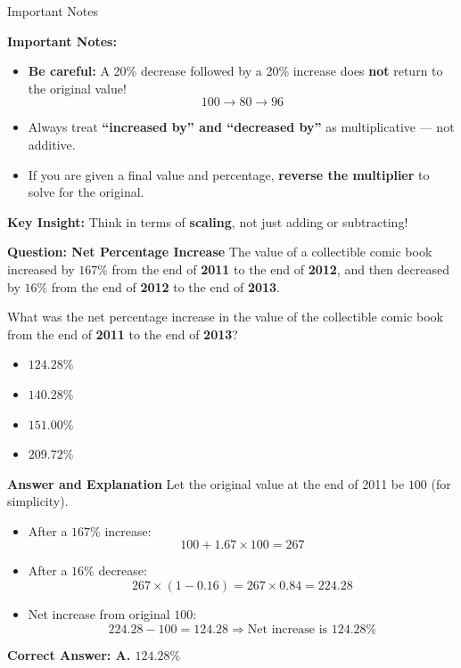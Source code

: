 \documentclass{beamer}
\begin{document}
\begin{frame}{Important Notes}

\vspace{0.1cm}
\textbf{Important Notes:}
\begin{itemize}
    \item \textbf{Be careful:} A 20\% decrease followed by a 20\% increase does \textbf{not} return to the original value!
    \[
    100 \to 80 \to 96
    \]
    \item Always treat \textbf{``increased by'' and ``decreased by''} as multiplicative — not additive.
    \item If you are given a final value and percentage, \textbf{reverse the multiplier} to solve for the original.
\end{itemize}

\vspace{0.2cm}
\textbf{Key Insight:} Think in terms of \textbf{scaling}, not just adding or subtracting!
    
\end{frame}

\begin{frame}{\textbf{Question: Net Percentage Increase}}
The value of a collectible comic book increased by \(167\%\) from the end of \textbf{2011} to the end of \textbf{2012}, and then decreased by \(16\%\) from the end of \textbf{2012} to the end of \textbf{2013}. 

What was the net percentage increase in the value of the collectible comic book from the end of \textbf{2011} to the end of \textbf{2013}?

\begin{itemize}
    \item[\textbf{A.}] \(124.28\%\)
    \item[\textbf{B.}] \(140.28\%\)
    \item[\textbf{C.}] \(151.00\%\)
    \item[\textbf{D.}] \(209.72\%\)
\end{itemize}
\end{frame}


\begin{frame}{\textbf{Answer and Explanation}}
Let the original value at the end of 2011 be \(100\) (for simplicity).

\begin{itemize}
    \item After a \(167\%\) increase: 
    \[
    100 + 1.67 \times 100 = 267
    \]
    \item After a \(16\%\) decrease: 
    \[
    267 \times (1 - 0.16) = 267 \times 0.84 = 224.28
    \]
    \item Net increase from original \(100\): 
    \[
    224.28 - 100 = 124.28 \Rightarrow \text{Net increase is } \boxed{124.28\%}
    \]
\end{itemize}

\textbf{Correct Answer: A. \(124.28\%\)}
\end{frame}
\end{document}
